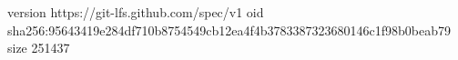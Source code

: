 version https://git-lfs.github.com/spec/v1
oid sha256:95643419e284df710b8754549cb12ea4f4b3783387323680146c1f98b0beab79
size 251437
